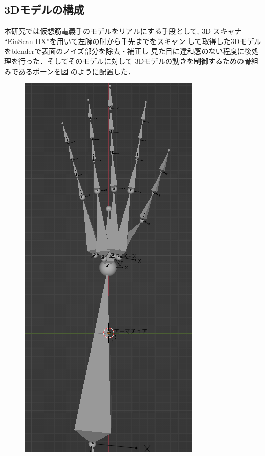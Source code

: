 \documentclass{ltjsarticle}
\begin{document}
	\subsection{3Dモデルの構成}
		本研究では仮想筋電義手のモデルをリアルにする手段として, 3D
		スキャナ ``EinScan HX''を用いて左腕の肘から手先までをスキャン
		して取得した3Dモデルをblenderで表面のノイズ部分を除去・補正し
		見た目に違和感のない程度に後処理を行った．そしてそのモデルに対して
		3Dモデルの動きを制御するための骨組みであるボーンを図
		のように配置した．
		\begin{figure}[H]
		\centering
		\begin{minipage}{0.292\columnwidth}
		\centering
		\includegraphics[width = \columnwidth]{figs/handboneLat.png}

\end{minipage}
\end{figure}
\end{document}
